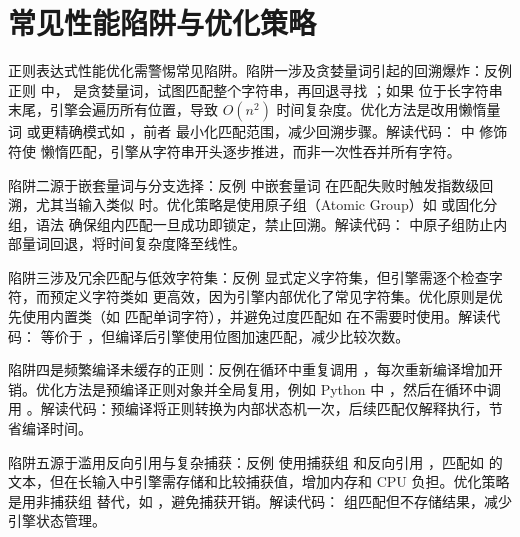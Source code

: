 \chapter{常见性能陷阱与优化策略}
正则表达式性能优化需警惕常见陷阱。陷阱一涉及贪婪量词引起的回溯爆炸：反例正则  中， 是贪婪量词，试图匹配整个字符串，再回退寻找 ；如果  位于长字符串末尾，引擎会遍历所有位置，导致 $O(n^2)$ 时间复杂度。优化方法是改用懒惰量词  或更精确模式如 ，前者  最小化匹配范围，减少回溯步骤。解读代码： 中  修饰符使  懒惰匹配，引擎从字符串开头逐步推进，而非一次性吞并所有字符。\par
陷阱二源于嵌套量词与分支选择：反例  中嵌套量词  在匹配失败时触发指数级回溯，尤其当输入类似  时。优化策略是使用原子组（Atomic Group）如  或固化分组，语法  确保组内匹配一旦成功即锁定，禁止回溯。解读代码： 中原子组防止内部量词回退，将时间复杂度降至线性。\par
陷阱三涉及冗余匹配与低效字符集：反例 \InlineCode{/[A-Za-z0-9\_{}]/} 显式定义字符集，但引擎需逐个检查字符，而预定义字符类如  更高效，因为引擎内部优化了常见字符集。优化原则是优先使用内置类（如  匹配单词字符），并避免过度匹配如  在不需要时使用。解读代码： 等价于 \InlineCode{[a-zA-Z0-9\_{}]}，但编译后引擎使用位图加速匹配，减少比较次数。\par
陷阱四是频繁编译未缓存的正则：反例在循环中重复调用 ，每次重新编译增加开销。优化方法是预编译正则对象并全局复用，例如 Python 中 ，然后在循环中调用 。解读代码：预编译将正则转换为内部状态机一次，后续匹配仅解释执行，节省编译时间。\par
陷阱五源于滥用反向引用与复杂捕获：反例  使用捕获组  和反向引用 ，匹配如  的文本，但在长输入中引擎需存储和比较捕获值，增加内存和 CPU 负担。优化策略是用非捕获组  替代，如 ，避免捕获开销。解读代码： 组匹配但不存储结果，减少引擎状态管理。\par
